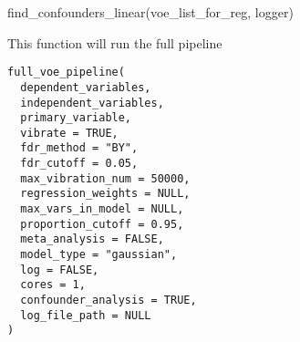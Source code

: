 \documentclass[a4paper]{book}
\begin{document}
%
\begin{Examples}
\begin{ExampleCode}
find_confounders_linear(voe_list_for_reg, logger)
\end{ExampleCode}
\end{Examples}
%
\begin{Description}\relax
This function will run the full pipeline
\end{Description}
%
\begin{Usage}
\begin{verbatim}
full_voe_pipeline(
  dependent_variables,
  independent_variables,
  primary_variable,
  vibrate = TRUE,
  fdr_method = "BY",
  fdr_cutoff = 0.05,
  max_vibration_num = 50000,
  regression_weights = NULL,
  max_vars_in_model = NULL,
  proportion_cutoff = 0.95,
  meta_analysis = FALSE,
  model_type = "gaussian",
  log = FALSE,
  cores = 1,
  confounder_analysis = TRUE,
  log_file_path = NULL
)
\end{verbatim}
\end{Usage}
%
\end{document}
